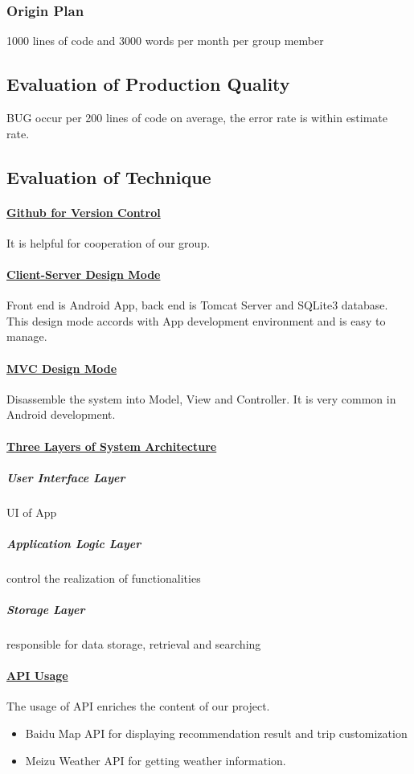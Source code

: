 \documentclass[10pt]{article}
\begin{document}
\subsubsection{Origin Plan}
1000 lines of code and 3000 words per month per group member

\subsection{Evaluation of Production Quality}
BUG occur per 200 lines of code on average, the error rate is within estimate rate.

\subsection{Evaluation of Technique}
\paragraph{\underline{Github for Version Control}} It is helpful for cooperation of our group.

\paragraph{\underline{Client-Server Design Mode}} Front end is Android App, back end is Tomcat Server and SQLite3 database. This design mode accords with App development environment and is easy to manage.

\paragraph{\underline{MVC Design Mode}} Disassemble the system into Model, View and Controller. It is very common in Android development.

\paragraph{\underline{Three Layers of System Architecture}}
\subparagraph{User Interface Layer} UI of App

\subparagraph{Application Logic Layer} control the realization of functionalities

\subparagraph{Storage Layer} responsible for data storage, retrieval and searching


\paragraph{\underline{API Usage}}The usage of API enriches the content of our project.
\begin{itemize}
	\item Baidu Map API for displaying recommendation result and trip customization
	\item Meizu Weather API for getting weather information.
\end{itemize}
\end{document}
